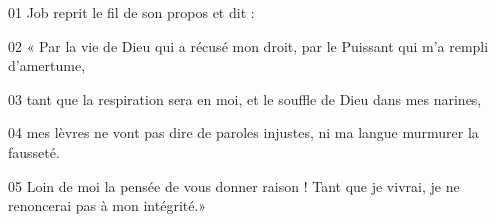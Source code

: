 01 Job reprit le fil de son propos et dit :

02 « Par la vie de Dieu qui a récusé mon droit, par le Puissant qui m’a rempli d’amertume,

03 tant que la respiration sera en moi, et le souffle de Dieu dans mes narines,

04 mes lèvres ne vont pas dire de paroles injustes, ni ma langue murmurer la fausseté.

05 Loin de moi la pensée de vous donner raison ! Tant que je vivrai, je ne renoncerai pas à mon intégrité.»
